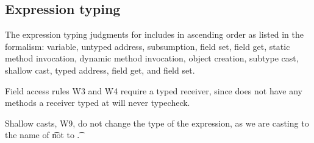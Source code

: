 \documentclass[a4paper,USenglish]{tex/lipics-v2016}
\begin{document}
\begin{mathpar}

\end{mathpar}

\begin{mathpar}
\end{mathpar}


\subsection{Expression typing}

The expression typing judgments for \kafka includes in ascending order as listed in the formalism:
variable, untyped address, subsumption, field set, field get, static method invocation, dynamic method invocation, object creation,
subtype cast, shallow cast, typed address,  field get, and  field set.

Field access rules W3 and W4 require a typed receiver, since \any does not
have any methods a receiver typed at \any will never typecheck.

Shallow casts, W9, do not change the type of the expression, as we are casting
to the name of \t not to \t.  

~\\
\end{document}
